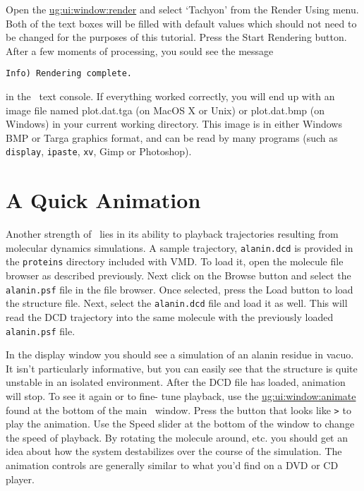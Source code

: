 Open the
\hyperref{{\sf Render} window}{{\sf Render} window [\S~}{]}{ug:ui:window:render}
and select `Tachyon' from the {\sf Render Using} menu. 
Both of the text boxes will be filled with default values which should 
not need to be changed for the purposes of this tutorial.
Press the {\sf Start Rendering} button.  
After a few moments of processing, you sould see the message
\begin{verbatim}
Info) Rendering complete.
\end{verbatim}
in the \VMD\ text console.
If everything worked correctly, you will
end up with an image file named plot.dat.tga (on MacOS X or Unix) or 
plot.dat.bmp (on Windows) in your current working directory.
This image is in either Windows BMP or Targa graphics format,
and can be read by many programs (such as {\tt display}, 
{\tt ipaste}, {\tt xv}, {\sf Gimp} or {\sf Photoshop}).

\section{A Quick Animation}
\label{ug:tutorial:animation}

Another strength of \VMD\ lies in its ability to playback trajectories
resulting from molecular dynamics simulations.  A sample trajectory,
{\tt alanin.dcd} is provided in the {\tt proteins} directory included 
with VMD.  To load it, open the molecule file browser as described
previously.
Next click on the {\sf Browse} button and select the {\tt alanin.psf}
file in the file browser.  Once selected, press the {\sf Load} button to 
load the structure file.  Next, select the {\tt alanin.dcd} file and
load it as well.  This will read the DCD trajectory \timesteps into the
same molecule with the previously loaded {\tt alanin.psf} file.

In the display window you should see a simulation of an alanin residue 
in vacuo.  It isn't particularly informative, but you can easily see that 
the structure is quite unstable in an isolated environment.  After the DCD
file has loaded, animation will stop.  
To see it again or to fine- tune playback, use the
\hyperref{{\sf animation} controls}{{\sf animation} controls  [\S }{]}{ug:ui:window:animate} 
found at the bottom of the main \VMD\ window.
Press the button that looks like {\tt >} to play the animation.  Use the 
{\sf Speed} slider at the bottom of the window to change the speed of playback.  
By rotating the molecule around, etc. you should get an idea about how
the system destabilizes over the course of the simulation.  The animation
controls are generally similar to what you'd find on a DVD or CD player.

